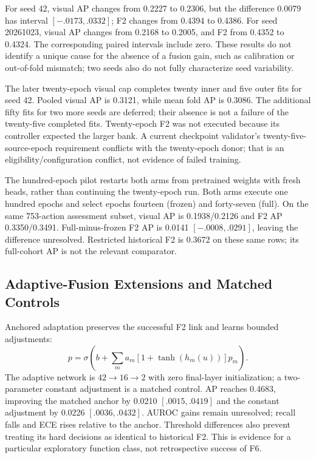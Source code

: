 For seed 42, visual AP changes from 0.2227 to 0.2306, but the difference 0.0079 has
interval $[-.0173,.0332]$; F2 changes from 0.4394 to 0.4386. For seed 20261023, visual
AP changes from 0.2168 to 0.2005, and F2 from 0.4352 to 0.4324. The corresponding paired
intervals include zero. These results do not identify a unique cause for the absence of
a fusion gain, such as calibration or out-of-fold mismatch; two seeds also do not fully
characterize seed variability.

The later twenty-epoch visual cap completes twenty inner and five outer fits for seed
42. Pooled visual AP is 0.3121, while mean fold AP is 0.3086. The additional fifty fits
for two more seeds are deferred; their absence is not a failure of the twenty-five
completed fits. Twenty-epoch F2 was not executed because its controller expected the
larger bank. A current checkpoint validator's twenty-five-source-epoch requirement
conflicts with the twenty-epoch donor; that is an eligibility/configuration conflict,
not evidence of failed training.

The hundred-epoch pilot restarts both arms from pretrained weights with fresh heads,
rather than continuing the twenty-epoch run. Both arms execute one hundred epochs and
select epochs fourteen (frozen) and forty-seven (full). On the same 753-action
assessment subset, visual AP is 0.1938/0.2126 and F2 AP 0.3350/0.3491. Full-minus-frozen
F2 AP is 0.0141 $[-.0008,.0291]$, leaving the difference unresolved. Restricted
historical F2 is 0.3672 on these same rows; its full-cohort AP is not the relevant
comparator.

\subsection{Adaptive-Fusion Extensions and Matched Controls}
Anchored adaptation preserves the successful F2 link and learns bounded adjustments:
\begin{equation}p=\sigma\!\left(b+\sum_m a_m[1+\tanh(h_m(u))]p_m\right).\end{equation}
The adaptive network is $42\rightarrow16\rightarrow2$ with zero final-layer
initialization; a two-parameter constant adjustment is a matched control. AP reaches
0.4683, improving the matched anchor by 0.0210 $[.0015,.0419]$ and the constant
adjustment by 0.0226 $[.0036,.0432]$. AUROC gains remain unresolved; recall falls and
ECE rises relative to the anchor. Threshold differences also prevent treating its hard
decisions as identical to historical F2. This is evidence for a particular exploratory
function class, not retrospective success of F6.

